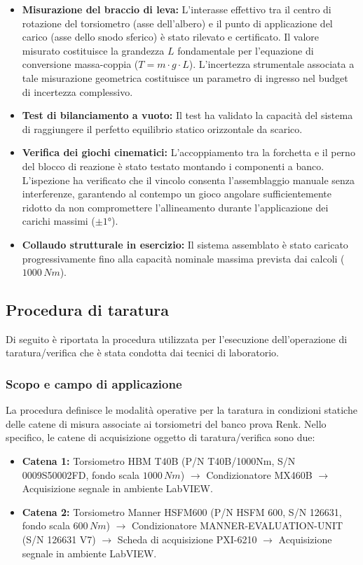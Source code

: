 \documentclass[a4paper, twoside]{article}
\begin{document}
\begin{itemize}
    \item \textbf{Misurazione del braccio di leva:} L'interasse effettivo tra il centro di rotazione del torsiometro (asse dell'albero) e il punto di applicazione del carico (asse dello snodo sferico) è stato rilevato e certificato. Il valore misurato costituisce la grandezza $L$ fondamentale per l'equazione di conversione massa-coppia ($T = m \cdot g \cdot L$). L'incertezza strumentale associata a tale misurazione geometrica costituisce un parametro di ingresso nel budget di incertezza complessivo.
    \item \textbf{Test di bilanciamento a vuoto:} Il test ha validato la capacità del sistema di raggiungere il perfetto equilibrio statico orizzontale da scarico.
    \item \textbf{Verifica dei giochi cinematici:} L'accoppiamento tra la forchetta e il perno del blocco di reazione è stato testato montando i componenti a banco. L'ispezione ha verificato che il vincolo consenta l'assemblaggio manuale senza interferenze, garantendo al contempo un gioco angolare sufficientemente ridotto da non compromettere l'allineamento durante l'applicazione dei carichi massimi ($\pm 1$°).
    \item \textbf{Collaudo strutturale in esercizio:} Il sistema assemblato è stato caricato progressivamente fino alla capacità nominale massima prevista dai calcoli ($1000\,Nm$).
\end{itemize}

\subsection{Procedura di taratura}

Di seguito è riportata la procedura utilizzata per l'esecuzione dell'operazione di taratura/verifica che è stata condotta dai tecnici di laboratorio.

\subsubsection{Scopo e campo di applicazione}
La procedura definisce le modalità operative per la taratura in condizioni statiche delle catene di misura associate ai torsiometri del banco prova Renk. Nello specifico, le catene di acquisizione oggetto di taratura/verifica sono due:

\begin{itemize}
    \item \textbf{Catena 1:} Torsiometro HBM T40B (P/N T40B/1000Nm, S/N 0009S50002FD, fondo scala $1000\,Nm$) $\rightarrow$ Condizionatore MX460B $\rightarrow$ Acquisizione segnale in ambiente LabVIEW.
    \item \textbf{Catena 2:} Torsiometro Manner HSFM600 (P/N HSFM 600, S/N 126631, fondo scala $600\,Nm$) $\rightarrow$ Condizionatore MANNER-EVALUATION-UNIT (S/N 126631 V7) $\rightarrow$ Scheda di acquisizione PXI-6210 $\rightarrow$ Acquisizione segnale in ambiente LabVIEW.
\end{itemize}
\end{document}
